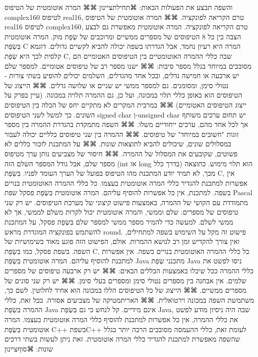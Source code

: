       והשפה תבצע את הפעולות הבאות:
      ⌘תחילת{ציינון}
      ⌘⌘ המרה אוטומטית של הטיפוס complex160 לטיפוס real16, טרם הקריאה לפונקציה.
      ⌘⌘ המרה אוטומטית של הטיפוס real16 לטיפוס complex160, טרם הקריאה לפונקציה.
      המרה אוטומטית מאפשרת גם לבצע הצבה בין כל 8 הטיפוסים של מספרים ממשיים ומרוכבים של שְׂפַת מוק.
      המרה אוטומטית בִּשְׂפַת C
      המרה היא רעיון נחמד, אבל הגדרתו בשפה יכולה להביא לקשיים גדולים. דוגמא קלסית לכך היא שְׂפַת C, שבה כללי ההמרה האוטומטיים בין הטיפוסים האטומיים הם מסובכים במיוחד בגלל מספר סיבות:
      ⌘⌘ ישנו מספר רב של טיפוסים אטומיים. למספר שלם יש ארבעה או חמישה גדלים, ובכל אחד מהגדלים, השלמים יכולים להופיע בשתי צורות - נטולי סימן, ומסומנים. גם למספר ממשי יש שניים או שלושה גדלים.
      ⌘⌘ הייצוג של הטיפוסים הוא באופן כללי תלוי במכונה, ועל כן, גם ההמרה תלויה במכונה. (עיין בפרק על ייצוג הטיפוסים האטומיים)
      ⌘⌘ במרבית המקרים לא מתקיים יחס של הכלה בין הטיפוסים השונים. כך למשל לשני הטיפוסים signed char וְ-unsigned char יש תחום ערכים משותף אך לכל אחד מהם, ערכים ייחודיים משלו.
      ⌘⌘ השפה מתמקדת בהגדרת ההמרה בין מספר זוגות "חשובים במיוחד" של טיפוסים.
      ⌘⌘ ההמרה בין שני טיפוסים כלליים יכולה לעבור במסלולים שונים, שיכולים להביא לתוצאות שונות.
      ⌘⌘ על המתכנת לזכור כללים לא פשוטים, שקובעים את המסלול של ההמרה.
      ⌘⌘ חיסור של מצביעים נותן ערך מטיפוס מספר שלם, אבל גודל המספר השלם הזה (int או long בדרך כלל) הוא תלוי מימוש. כתוצאה מכך, לא תמיד יודע המתכנת מהו הטיפוס בפועל של הערך העומד לפניו.
      בִּשְׂפַת C, אין אפשרות למתכנת להגדיר כללי המרה אוטומטית בעצמו. כל כללי ההמרה האוטומטית בנויים בשפה. למתכנת, אין כל אפשרות להוסיף עליהם.
      המרה אוטומטית בִּשְׂפַת פסקל
      שפת Pascal מתמודדת עם הקושי של ההמרה, באמצעות פישוט קיצוני של מערכת הטיפוסים. יש רק שני טיפוסים של מספרים: שלם וממשי, והמרה אוטומטית יכול לקרות משלם לממשי, אך לא ממשי לשלם. למעשה כדי להמיר מספר ממשי למספר שלם בִּשְׂפַת פסקל, על המתכנת להשתמש בפונקציה המוגדרת מראש round.
      פישוט זה מקל על השימוש בשפה למתחילים, ואין צורך להקדיש זמן רב לנושא ההמרות. אולם, הפישוט הזה פוגע מאוד בשימושיות של השפה.
      בשפת פסקל, כמו בִּשְׂפַת C, כל כללי ההמרה האוטומטית בנויים בשפה. אין אפשרות למתכנת להוסיף עליהם.
      המרה אוטומטית בִּשְׂפַת Java
      מתכנני שְׂפַת Java ניסו לפשט את כללי ההמרה ככל שיכלו באמצעות הכללים הבאים:
      ⌘⌘ יש רק ארבעה טיפוסים של מספרים שלמים. אין אבחנה בין מספרים נטולי סימן ומספרים בעלי סימן.
      ⌘⌘ יש רק שני סוגים של מספרים ממשיים.
      ⌘⌘ הייצוג של כל הטיפוסים הללו במכונה הוא אחיד לחלוטין. לשם כך, משתמשת השפה במכונה וירטואלית.
      ⌘⌘ האריתמטיקה של מצביעים אסורה.
      בכל זאת, כללי ההמרה בִּשְׂפַת Java אינם מידיים. קל לנחש כי גם בִּשְׂפַת Java, שבה היה ניסיון מודע לפשט את כללי ההמרה, אין כל אפשרות למתכנת להוסיף כללי המרה אוטומטית בעצמו.
      המרה אוטומטית בִּשְׂפַת C++
      בשפתC++ לעומת זאת, כללי ההעמסה מסובכים הרבה יותר בגלל שהשפה מאפשרת למתכנת להגדיר כללי המרה אוטומטית. זאת ניתן לעשות בשתי דרכים שונות:
  ⌘סוף{ציינון}

